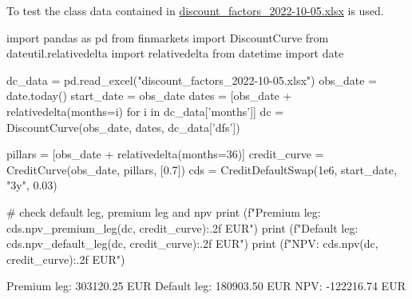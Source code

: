 To test the class data contained in \href{https://github.com/matteosan1/finance_course/raw/master/input_files/discount_factors_2022-10-05.xlsx}{discount\_factors\_2022-10-05.xlsx} is used.

\begin{ipython}
import pandas as pd
from finmarkets import DiscountCurve
from dateutil.relativedelta import relativedelta
from datetime import date

dc_data = pd.read_excel("discount_factors_2022-10-05.xlsx")
obs_date = date.today() 
start_date = obs_date
dates = [obs_date + relativedelta(months=i) for i in dc_data['months']]
dc = DiscountCurve(obs_date, dates, dc_data['dfs'])

pillars = [obs_date + relativedelta(months=36)]
credit_curve = CreditCurve(obs_date, pillars, [0.7])
cds = CreditDefaultSwap(1e6, start_date, "3y", 0.03)

# check default leg, premium leg and npv
print (f"Premium leg: {cds.npv_premium_leg(dc, credit_curve):.2f} EUR")
print (f"Default leg: {cds.npv_default_leg(dc, credit_curve):.2f} EUR")
print (f"NPV: {cds.npv(dc, credit_curve):.2f} EUR")
\end{ipython}
\begin{ioutput}
Premium leg: 303120.25 EUR
Default leg: 180903.50 EUR
NPV: -122216.74 EUR
\end{ioutput}
	
